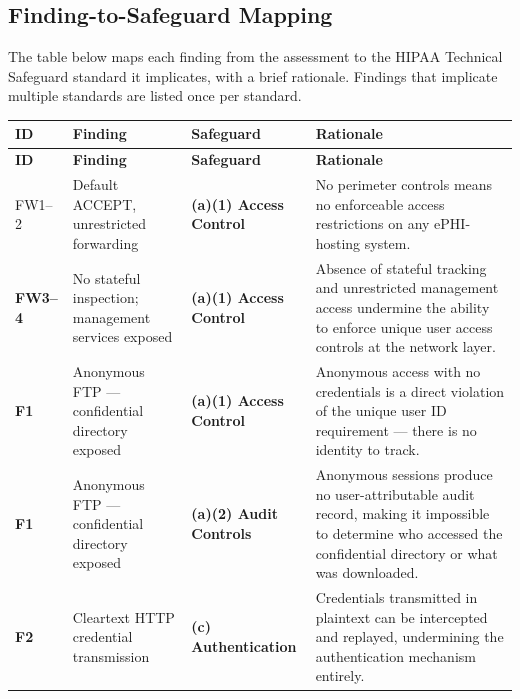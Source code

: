 \documentclass[12pt]{article}
\newcommand{\hipbadge}[2]{%
  \colorbox{#1}{\color{white}\textbf{\small #2}}%
}
\begin{document}
\subsection{Finding-to-Safeguard Mapping}
 
The table below maps each finding from the assessment to the HIPAA Technical
Safeguard standard it implicates, with a brief rationale. Findings that
implicate multiple standards are listed once per standard.
 
\bigskip
 
\noindent
\begin{longtable}{>{\bfseries}p{0.8cm} p{3.6cm} p{4.5cm} p{3.8cm}}
  \rowcolor{headercol}
  \color{white}\textbf{ID} &
  \color{white}\textbf{Finding} &
  \color{white}\textbf{Safeguard} &
  \color{white}\textbf{Rationale} \\
  \endfirsthead
  \rowcolor{headercol}
  \color{white}\textbf{ID} &
  \color{white}\textbf{Finding} &
  \color{white}\textbf{Safeguard} &
  \color{white}\textbf{Rationale} \\
  \endhead
  \midrule
 
  FW1--2 &
  Default ACCEPT, unrestricted forwarding &
  \hipbadge{acccol}{(a)(1) Access Control} &
  No perimeter controls means no enforceable access restrictions on any
  ePHI-hosting system. \\[4pt]
 
  FW3--4 &
  No stateful inspection; management services exposed &
  \hipbadge{acccol}{(a)(1) Access Control} &
  Absence of stateful tracking and unrestricted management access undermine
  the ability to enforce unique user access controls at the network layer.
  \\[4pt]
 
  F1 &
  Anonymous FTP --- confidential directory exposed &
  \hipbadge{acccol}{(a)(1) Access Control} &
  Anonymous access with no credentials is a direct violation of the unique
  user ID requirement --- there is no identity to track. \\[4pt]
 
  F1 &
  Anonymous FTP --- confidential directory exposed &
  \hipbadge{headercol}{(a)(2) Audit Controls} &
  Anonymous sessions produce no user-attributable audit record, making
  it impossible to determine who accessed the confidential directory or
  what was downloaded. \\[4pt]
 
  F2 &
  Cleartext HTTP credential transmission &
  \hipbadge{authcol}{(c) Authentication} &
  Credentials transmitted in plaintext can be intercepted and replayed,
  undermining the authentication mechanism entirely. \\[4pt]
 

\end{longtable}
\end{document}
